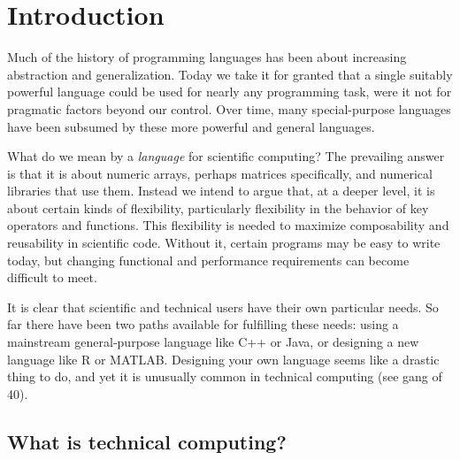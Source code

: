 \chapter{Introduction}

Much of the history of programming languages has been about increasing abstraction
and generalization. Today we take it for granted that a single suitably powerful
language could be used for nearly any programming task, were it not for pragmatic
factors beyond our control. Over time, many special-purpose languages
have been subsumed by these more powerful and general languages.


What do we mean by a \emph{language} for scientific computing?
The prevailing
answer is that it is about numeric arrays, perhaps matrices specifically,
and numerical libraries that use them.
Instead we intend to argue that, at a
deeper level, it is about certain kinds of flexibility, particularly
flexibility in the behavior of key operators and functions. This flexibility
is needed to maximize composability and reusability in scientific code.
Without it, certain programs may be easy to write today, but changing
functional and performance requirements can become difficult to meet.


It is clear that scientific and technical users have their own particular
needs. So far there have been two paths available for fulfilling these
needs: using a mainstream general-purpose language like C++ or Java, or
designing a new language like R or MATLAB. Designing your own language
seems like a drastic thing to do, and yet it is unusually common in
technical computing (see gang of 40).


\section{What is technical computing?}

